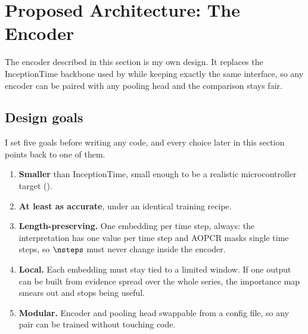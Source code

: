 %

\section{Proposed Architecture: The \seanet{} Encoder}
\label{sec:architecture}

\begin{contribution}
The encoder described in this section is my own design. It replaces the InceptionTime backbone used
by \millet{} while keeping exactly the same interface, so any encoder can be paired with any pooling
head and the comparison stays fair.
\end{contribution}

\subsection{Design goals}
\label{sec:arch:goals}

I set five goals before writing any code, and every choice later in this section points back to one
of them.

\begin{enumerate}\itemsep2pt
  \item[\textbf{G1}] \textbf{Smaller} than InceptionTime, small enough to be a realistic
        microcontroller target ().
  \item[\textbf{G2}] \textbf{At least as accurate}, under an identical training recipe.
  \item[\textbf{G3}] \textbf{Length-preserving.} One embedding per time step, always: the
        interpretation has one value per time step and AOPCR masks single time steps, so $\nsteps$
        must never change inside the encoder.
  \item[\textbf{G4}] \textbf{Local.} Each embedding must stay tied to a limited window. If one
        output can be built from evidence spread over the whole series, the importance map smears
        out and stops being useful.
  \item[\textbf{G5}] \textbf{Modular.} Encoder and pooling head swappable from a config file, so any
        pair can be trained without touching code.
\end{enumerate}

